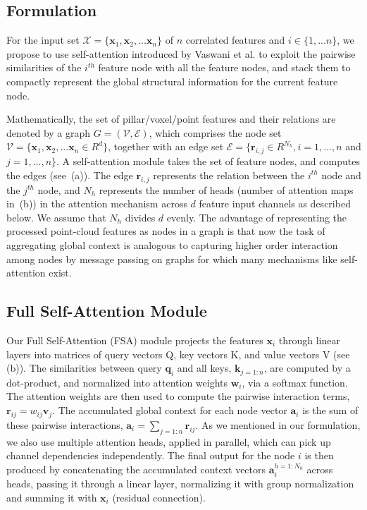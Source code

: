 \documentclass[10pt,twocolumn,letterpaper]{article}
\begin{document}
\subsection{Formulation}
For the input set $\mathcal{X}=\{\textbf{x}_1, \textbf{x}_2,...\textbf{x}_n\}$ of $n$ correlated features and $i \in \{1,...n\}$, we propose to use self-attention introduced by Vaswani et al. \cite{SA} to exploit the pairwise similarities of the $i^{th}$ feature node with all the feature nodes, and stack them to compactly represent the global structural information for the current feature node. 

Mathematically, the set of pillar/voxel/point features and their relations are denoted by a graph $G= (\mathcal{V},\mathcal{E})$, which comprises the node set $\mathcal{V} = \{\textbf{x}_1, \textbf{x}_2,...\textbf{x}_n \in R^d \}$, together with an edge set $\mathcal{E} = \{\textbf{r}_{i,j} \in R^{N_h}, i= 1,...,n$ and $j= 1,...,n\}$. A self-attention module takes the set of feature nodes, and computes the edges (see \,(a)). The edge $\textbf{r}_{i,j}$ represents the relation between the $i^{th}$ node and the $j^{th}$ node, and $N_h$ represents the number of heads (number of attention maps in \,(b)) in the attention mechanism across $d$ feature input channels as described below. We assume that $N_h$ divides $d$ evenly. The advantage of representing the processed point-cloud features as nodes in a graph is that now the task of aggregating global context is analogous to capturing higher order interaction among nodes by message passing on graphs for which many mechanisms like self-attention exist. 

\subsection{Full Self-Attention Module}
Our Full Self-Attention (FSA) module projects the features $\textbf{x}_i$ through linear layers into matrices of query vectors Q, key vectors K, and value vectors V (see (b)). The similarities between query $\textbf{q}_i$ and all keys, $\textbf{k}_{j=1:n}$, are computed by a dot-product, and normalized into attention weights $\textbf{w}_i$, via a softmax function. The attention weights are then used to compute the pairwise interaction terms, $\textbf{r}_{ij} = w_{ij}\textbf{v}_j$. The accumulated global context for each node vector $\textbf{a}_i$ is the sum of these pairwise interactions, $\textbf{a}_i =\sum_{j=1:n} \textbf{r}_{ij}$. As we mentioned in our formulation, we also use multiple attention heads, applied in parallel, which can pick up channel dependencies independently. The final output for the node $i$ is then produced by concatenating the accumulated context vectors $\textbf{a}_i^{h=1:N_h}$ across heads, passing it through a linear layer, normalizing it with group normalization \cite{group} and summing it with $\textbf{x}_i$ (residual connection).
\end{document}
